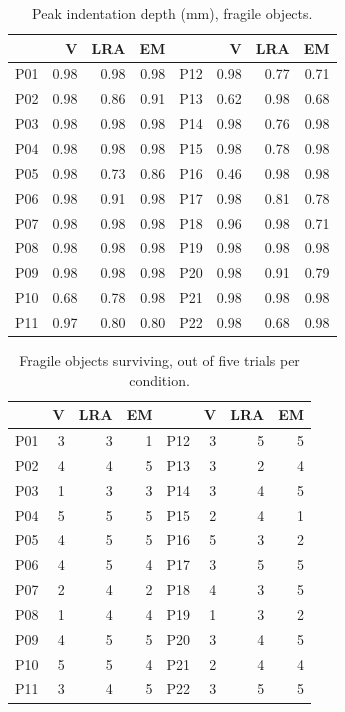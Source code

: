 \documentclass[12pt, a4paper, twoside, openright]{report}
\begin{document}
\begin{table}[ht]
    \centering
    \small
    \caption{Peak indentation depth (mm), fragile objects.}
    \label{tab:appB-frag-depth}
    \begin{tabular}{@{}lrrr@{\hspace{2em}}lrrr@{}}
        \toprule
            & V    & LRA  & EM   &     & V    & LRA  & EM   \\
        \midrule
        P01 & 0.98 & 0.98 & 0.98 & P12 & 0.98 & 0.77 & 0.71 \\
        P02 & 0.98 & 0.86 & 0.91 & P13 & 0.62 & 0.98 & 0.68 \\
        P03 & 0.98 & 0.98 & 0.98 & P14 & 0.98 & 0.76 & 0.98 \\
        P04 & 0.98 & 0.98 & 0.98 & P15 & 0.98 & 0.78 & 0.98 \\
        P05 & 0.98 & 0.73 & 0.86 & P16 & 0.46 & 0.98 & 0.98 \\
        P06 & 0.98 & 0.91 & 0.98 & P17 & 0.98 & 0.81 & 0.78 \\
        P07 & 0.98 & 0.98 & 0.98 & P18 & 0.96 & 0.98 & 0.71 \\
        P08 & 0.98 & 0.98 & 0.98 & P19 & 0.98 & 0.98 & 0.98 \\
        P09 & 0.98 & 0.98 & 0.98 & P20 & 0.98 & 0.91 & 0.79 \\
        P10 & 0.68 & 0.78 & 0.98 & P21 & 0.98 & 0.98 & 0.98 \\
        P11 & 0.97 & 0.80 & 0.80 & P22 & 0.98 & 0.68 & 0.98 \\
        \bottomrule
    \end{tabular}
\end{table}

\begin{table}[ht]
    \centering
    \small
    \caption{Fragile objects surviving, out of five trials per condition.}
    \label{tab:appB-frag-surv}
    \begin{tabular}{@{}lrrr@{\hspace{2em}}lrrr@{}}
        \toprule
            & V & LRA & EM &     & V & LRA & EM \\
        \midrule
        P01 & 3 & 3   & 1  & P12 & 3 & 5   & 5  \\
        P02 & 4 & 4   & 5  & P13 & 3 & 2   & 4  \\
        P03 & 1 & 3   & 3  & P14 & 3 & 4   & 5  \\
        P04 & 5 & 5   & 5  & P15 & 2 & 4   & 1  \\
        P05 & 4 & 5   & 5  & P16 & 5 & 3   & 2  \\
        P06 & 4 & 5   & 4  & P17 & 3 & 5   & 5  \\
        P07 & 2 & 4   & 2  & P18 & 4 & 3   & 5  \\
        P08 & 1 & 4   & 4  & P19 & 1 & 3   & 2  \\
        P09 & 4 & 5   & 5  & P20 & 3 & 4   & 5  \\
        P10 & 5 & 5   & 4  & P21 & 2 & 4   & 4  \\
        P11 & 3 & 4   & 5  & P22 & 3 & 5   & 5  \\
        \bottomrule
    \end{tabular}
\end{table}
\end{document}
